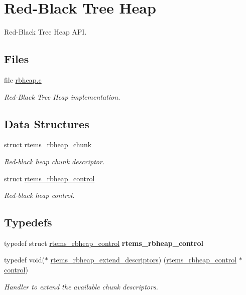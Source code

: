 \hypertarget{group__RBHeap}{}\section{Red-\/\+Black Tree Heap}
\label{group__RBHeap}


Red-\/\+Black Tree Heap A\+PI.  


\subsection*{Files}
\begin{DoxyCompactItemize}
\item 
file \mbox{\hyperlink{rbheap_8c}{rbheap.\+c}}
\begin{DoxyCompactList}\small\item\em Red-\/\+Black Tree Heap implementation. \end{DoxyCompactList}\end{DoxyCompactItemize}
\subsection*{Data Structures}
\begin{DoxyCompactItemize}
\item 
struct \mbox{\hyperlink{structrtems__rbheap__chunk}{rtems\+\_\+rbheap\+\_\+chunk}}
\begin{DoxyCompactList}\small\item\em Red-\/black heap chunk descriptor. \end{DoxyCompactList}\item 
struct \mbox{\hyperlink{structrtems__rbheap__control}{rtems\+\_\+rbheap\+\_\+control}}
\begin{DoxyCompactList}\small\item\em Red-\/black heap control. \end{DoxyCompactList}\end{DoxyCompactItemize}
\subsection*{Typedefs}
\begin{DoxyCompactItemize}
\item 
\mbox{\label{group__RBHeap_gad5aaee5a75cae8272a616e28fe89d473}} 
typedef struct \mbox{\hyperlink{structrtems__rbheap__control}{rtems\+\_\+rbheap\+\_\+control}} {\bfseries rtems\+\_\+rbheap\+\_\+control}
\item 
typedef void($\ast$ \mbox{\hyperlink{group__RBHeap_gaa15b8f5425b4d2aa188607bb9941fb20}{rtems\+\_\+rbheap\+\_\+extend\+\_\+descriptors}}) (\mbox{\hyperlink{structrtems__rbheap__control}{rtems\+\_\+rbheap\+\_\+control}} $\ast$\mbox{\hyperlink{structcontrol}{control}})
\begin{DoxyCompactList}\small\item\em Handler to extend the available chunk descriptors. \end{DoxyCompactList}\end{DoxyCompactItemize}

